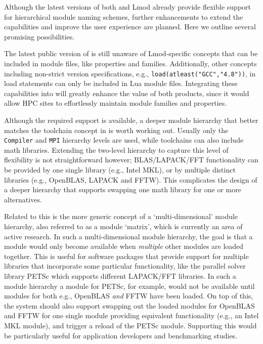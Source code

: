 Although the latest versions of both \easybuild{} and Lmod already provide
flexible support for hierarchical module naming schemes, further enhancements
to extend the capabilities and improve the user experience are planned.
Here we outline several promising possibilities.

The latest public version of \easybuild{} is still unaware of Lmod-specific
concepts that can be included in module files, like properties and families.
Additionally, other concepts including non-strict version specifications, e.g.,
\texttt{\small load(atleast("GCC","4.8"))}, in 
load statements can only be included in Lua module files.
Integrating these capabilities into \easybuild{} will
greatly enhance the value of both products, since it would allow HPC sites to
effortlessly maintain module families and properties.

Although the required support is available, a deeper module hierarchy that
better matches the toolchain concept in \easybuild{} is worth working out.
Usually only the \texttt{Compiler} and \texttt{MPI} hierarchy levels are used,
while \easybuild{} toolchains can also include math libraries. Extending
the two-level hierarchy to capture this level of flexibility is not straightforward
however; BLAS/LAPACK/FFT functionality can be provided by one single library (e.g.,
Intel MKL), or by multiple distinct libraries (e.g., OpenBLAS, LAPACK and FFTW).
This complicates the design of a deeper hierarchy that supports swapping one
math library for one or more alternatives.

Related to this is the more generic concept of a `multi-dimensional' module hierarchy,
also referred to as a module `matrix', which is currently an area of active research.
In such a multi-dimensional module hierarchy, the goal is that a module would
only become available when \emph{multiple} other modules are loaded together. This is
useful for software packages that provide support for multiple libraries that
incorporate some particular functionality, like the parallel
solver library PETSc which supports different LAPACK/FFT libraries. In such a module
hierarchy a module for PETSc, for example, would not be available until modules
for both e.g., OpenBLAS \emph{and} FFTW have been loaded. On top of this, the system
should also support swapping out the loaded modules for OpenBLAS and FFTW for one
single module providing equivalent functionality (e.g., an Intel MKL module), and
trigger a reload of the PETSc module. Supporting this would be particularly useful for
application developers and benchmarking studies.


